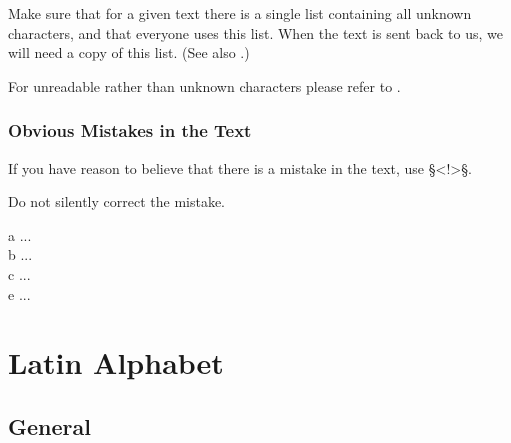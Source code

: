 \begin{note}
Make sure that for a given text there is a single list containing all unknown characters, and that everyone uses this list. When the text is sent back to us, we will need a copy of this list. (See also .)
\end{note}

\begin{crossref}
For unreadable rather than unknown characters please refer to .
\end{crossref}

\subsubsection{Obvious Mistakes in the Text}
\label{section obvious mistakes}

\begin{mainrule}
If you have reason to believe that there is a mistake in the text, use §<!>§.
\end{mainrule}

\begin{clarification}
Do not silently correct the mistake.
\end{clarification}

\vspace{3mm}
\begin{example}

\vspace{-5mm}
\begin{typeLatin}
 a\bold{>} ...  \\
 b\bold{>} ...  \\
 c\bold{>} ...  \\
 e\bold{><!>} ...  \\
\end{typeLatin}
\end{example}


\section{Latin Alphabet}

\tocspace
\subsection{General}
\label{section latin general}

